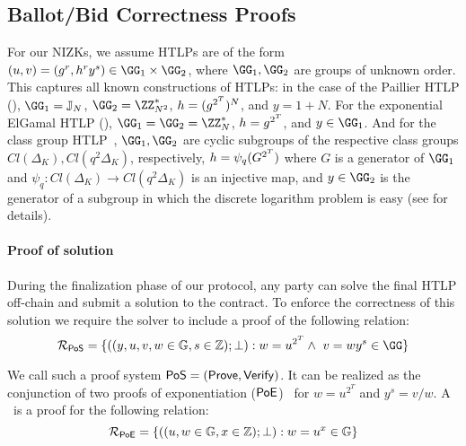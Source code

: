 \subsection{Ballot/Bid Correctness Proofs}\label{sec:sigmas}

For our NIZKs, we assume HTLPs are of the form $(u,v) = (g^r, h^r y^s) \in \GG_1 \times \GG_2$, where $\GG_1, \GG_2$ are groups of unknown order. 
This captures all known constructions of HTLPs: in the case of the Paillier HTLP (), $\GG_1 = \mathbb{J}_N$, $\GG_2 = \ZZ_{N^2}^*$, $h = (g^{2^{T}})^N$, and $y = 1+N$. For the exponential ElGamal HTLP (), $\GG_1 = \GG_2 = \ZZ_N^*$, $h = g^{2^{T}}$, and $y \in \GG_1$. And for the class group HTLP~\cite{CCS:TCLM21}, $\GG_1,\GG_2$ are cyclic subgroups of the respective class groups $Cl(\Delta_K), Cl(q^2\Delta_K)$, respectively, $h = \psi_q(G^{2^{T}})$ where $G$ is a generator of $\GG_1$ and $\psi_q : Cl(\Delta_K) \to Cl(q^2 \Delta_K)$ is an injective map, and $y \in \GG_2$ is the generator of a subgroup in which the discrete logarithm problem is easy (see \cite{CCS:TCLM21} for details).

\paragraph{Proof of solution}


% 

During the finalization phase of our protocol, any party can solve the final HTLP off-chain and submit a solution to the contract. To enforce the correctness of this solution we require the solver to include a proof of the following relation:
\begin{equation}
    \mathcal{R}_{\pos}=\{((y,u,v,w\in\mathbb{G},s\in\mathbb{Z});\bot): w = u^{2^\Ttime} \land\ v = w y^s \in \GG\}
\end{equation}

We call such a proof system ${\sf PoS} = (\mathsf{Prove}, \mathsf{Verify})$. It can be realized as the conjunction of two proofs of exponentiation ($\mathsf{PoE}$)~\cite{ITCS:Pietrzak19b,EC:Wesolowski19} for $w = u^{2^T}$ and $y^s = v/w$.
A \poe\ is a proof for the following relation:
\[
    \mathcal{R}_{\mathsf{PoE}}=\{((u,w\in\mathbb{G},x\in\mathbb{Z});\bot):w=u^{x}\in\mathbb{G}\}
\]

